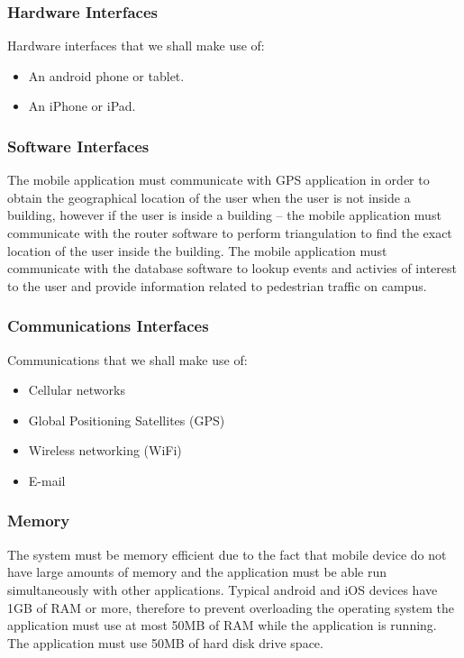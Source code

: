 \documentclass[english]{article}
\begin{document}
				\subsubsection{Hardware Interfaces}
				    Hardware interfaces that we shall make use of:
						\begin{itemize}
						    \item An android phone or tablet.
						    \item An iPhone or iPad.
						\end{itemize}

				\subsubsection{Software Interfaces}
						The mobile application must communicate with GPS application in order to obtain the geographical location of the user when the user is not inside a building, however if the user is inside a building – the mobile application must communicate with the router software to perform triangulation to find the exact location of the user inside the building.
						The mobile application must communicate with the database software to lookup events and  activies of interest to the user and provide information related to pedestrian traffic on campus.

				\subsubsection{Communications Interfaces}
				    Communications that we shall make use of:
					\begin{itemize}
					    \item Cellular networks
					    \item Global Positioning Satellites (GPS)
					    \item Wireless networking (WiFi)
					    \item E-mail
					\end{itemize}

				\subsubsection{Memory}
					The system must be memory efficient due to the fact that mobile device do not have large amounts of memory and the application must be able run simultaneously with other applications.  
                    Typical android and iOS devices have 1GB of RAM or more, therefore to prevent overloading the operating system the application must use at most 50MB of RAM while the application is running.
                    The application must use 50MB of hard disk drive space.
\end{document}
